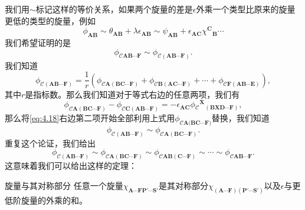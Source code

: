 我们用$\sim $标记这样的等价关系，如果两个旋量的差是$\epsilon $外乘一个类型比原来的旋量更低的类型的旋量，例如
\begin{equation*}
	\phi _{\boldsymbol{AB}} \sim \theta _{\boldsymbol{AB}} +\lambda \epsilon _{\boldsymbol{AB}} \sim \psi _{\boldsymbol{AB}} +\epsilon _{\boldsymbol{AC}} \chi ^{\boldsymbol{C}}{}_{\boldsymbol{B}} \cdots 
\end{equation*}
我们希望证明的是
\begin{equation*}
	\phi _{\mathcal{C}\boldsymbol{AB} \cdots \boldsymbol{F}} \sim \phi _{\mathcal{C}(\boldsymbol{AB} \cdots \boldsymbol{F})} .
\end{equation*}
我们知道
\begin{equation}
	\phi _{\mathcal{C}(\boldsymbol{AB} \cdots \boldsymbol{F})} =\frac{1}{r}( \phi _{\mathcal{C}\boldsymbol{A}(\boldsymbol{BC} \cdots \boldsymbol{F})} +\phi _{\mathcal{C}\boldsymbol{B}(\boldsymbol{AC} \cdots \boldsymbol{F})} +\cdots +\phi _{\mathcal{C}\boldsymbol{F}(\boldsymbol{AB} \cdots \boldsymbol{E})}) ,
	\label{eq:4.18}
\end{equation}
其中$r$是指标数。那么我们知道对于等式右边的任意两项，我们有
\begin{equation*}
	\phi _{\mathcal{C}\boldsymbol{A}(\boldsymbol{BC} \cdots \boldsymbol{F})} -\phi _{\mathcal{C}\boldsymbol{C}(\boldsymbol{AB} \cdots \boldsymbol{F})} =-\epsilon _{\boldsymbol{AC}} \phi {_{\mathcal{C}}}^{\boldsymbol{X}}{}_{(\boldsymbol{BXD} \cdots \boldsymbol{F})} ,
\end{equation*}
那么将\ref{eq:4.18}右边第二项开始全部利用上式用$\phi _{\mathcal{C}\boldsymbol{A( BC} \cdots \boldsymbol{F})}$替换，我们知道
\begin{equation*}
	\phi _{\mathcal{C}(\boldsymbol{AB} \cdots \boldsymbol{F})} \sim \phi _{\mathcal{C}\boldsymbol{A}(\boldsymbol{BC} \cdots \boldsymbol{F})} .
\end{equation*}
重复这个论证，我们给出
\begin{equation*}
	\phi _{\mathcal{C}(\boldsymbol{AB} \cdots \boldsymbol{F})} \sim \phi _{\mathcal{C}\boldsymbol{A}(\boldsymbol{BC} \cdots \boldsymbol{F})} \sim \phi _{\mathcal{C}\boldsymbol{AB}(\boldsymbol{C} \cdots \boldsymbol{F})} \sim \cdots \sim \phi _{\mathcal{C}\boldsymbol{AB} \cdots \boldsymbol{F}} .
\end{equation*}
这意味着我们可以给出这样的定理：

\begin{them}[label={them:syemmtric part of a spinor}]{旋量与其对称部分}
	任意一个旋量$\chi _{\boldsymbol{A} \cdots \boldsymbol{FP} '\cdots \boldsymbol{S} '}$是其对称部分$\chi _{(\boldsymbol{A\cdots F})(\boldsymbol{P} '\cdots \boldsymbol{S} ')}$以及$\epsilon $与更低阶旋量的外乘的和。
\end{them}

